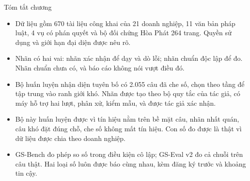 \FloatBarrier
\begin{hopy}{Tóm tắt chương}
\begin{itemize}
\item Dữ liệu gồm 670 tài liệu công khai của 21 doanh nghiệp, 11 văn bản pháp luật, 4 vụ có phán quyết và bộ đối chứng Hòa Phát 264 trang. Quyền sử dụng và giới hạn đại diện được nêu rõ.
\item Nhãn có hai vai: nhãn xác nhận để dạy và dò lỗi; nhãn chuẩn độc lập để đo. Nhãn chuẩn chưa có, và báo cáo không nói vượt điều đó.
\item Bộ huấn luyện nhận diện tuyên bố có 2.055 câu đã che số, chọn theo tầng để tập trung vào ranh giới khó. Nhãn được tạo theo bộ quy tắc của tác giả, có máy hỗ trợ hai lượt, phân xử, kiểm mẫu, và được tác giả xác nhận.
\item Bộ này huấn luyện được vì tín hiệu nằm trên bề mặt câu, nhãn nhất quán, câu khó đặt đúng chỗ, che số không mất tín hiệu. Con số đo được là thật vì dữ liệu được chia theo doanh nghiệp.
\item GS-Bench đo phép so số trong điều kiện cô lập; GS-Eval v2 đo cả chuỗi trên câu thật. Hai loại số luôn được báo cùng nhau, kèm đăng ký trước và khoảng tin cậy.
\end{itemize}
\end{hopy}
